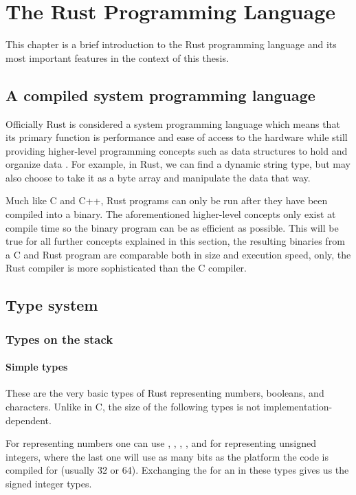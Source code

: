 \chapter{The Rust Programming Language}

This chapter is a brief introduction to the Rust programming language and its most important features in the context of this thesis.

\section{A compiled system programming language}

Officially Rust is considered a system programming language which means that its primary function is performance and ease of access to the hardware while still providing higher-level programming concepts such as data structures to hold and organize data \cite{SystemProgrammingLanguageWikipedia}. For example, in Rust, we can find a dynamic string type, but may also choose to take it as a byte array and manipulate the data that way.

Much like C and C++, Rust programs can only be run after they have been compiled into a binary. The aforementioned higher-level concepts only exist at compile time so the binary program can be as efficient as possible. This will be true for all further concepts explained in this section, the resulting binaries from a C and Rust program are comparable both in size and execution speed, only, the Rust compiler is more sophisticated than the C compiler.

\section{Type system}

\subsection{Types on the stack}

\subsubsection{Simple types}

These are the very basic types of Rust representing numbers, booleans, and characters. Unlike in C, the size of the following types is not implementation-dependent.

For representing numbers one can use , , , ,  and  for representing unsigned integers, where the last one will use as many bits as the platform the code is compiled for (usually 32 or 64). Exchanging the  for an  in these types gives us the signed integer types.

